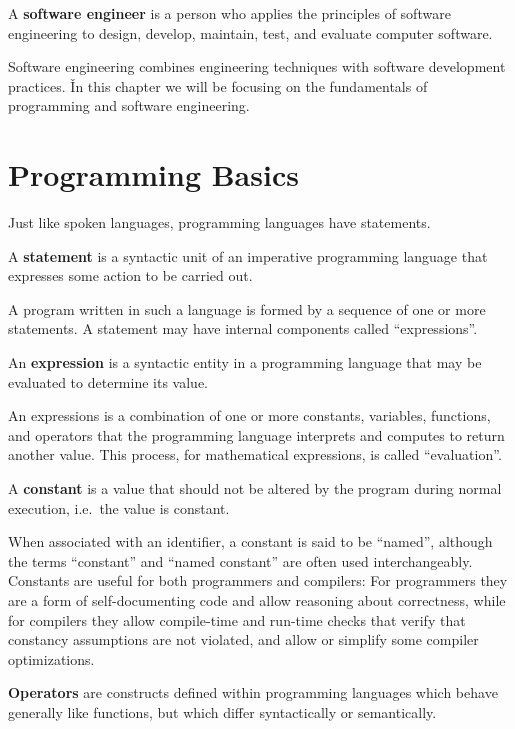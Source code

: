 A \textbf{software engineer} is a person who applies the principles of software engineering to design, develop,
maintain, test, and evaluate computer software.
\ed

Software engineering combines engineering techniques with software development practices. \v

In this chapter we will be focusing on the fundamentals of programming and software engineering.

\section{Programming Basics}

Just like spoken languages, programming languages have statements.

\bd[Statement]
A \textbf{statement} is a syntactic unit of an imperative programming language that expresses some action to be carried
out.
\ed

A program written in such a language is formed by a sequence of one or more statements. A statement may have internal
components called ``expressions''.

\bd[Expression]
An \textbf{expression} is a syntactic entity in a programming language that may be evaluated to determine its value.
\ed

An expressions is a combination of one or more constants, variables, functions, and operators that the programming
language interprets and computes to return another value. This process, for mathematical expressions, is called
``evaluation''.

\bd[Constant]
A \textbf{constant} is a value that should not be altered by the program during normal execution, i.e.\ the value is
constant.
\ed

When associated with an identifier, a constant is said to be ``named'', although the terms ``constant'' and ``named
constant'' are often used interchangeably. Constants are useful for both programmers and compilers: For programmers
they are a form of self-documenting code and allow reasoning about correctness, while for compilers they allow
compile-time and run-time checks that verify that constancy assumptions are not violated, and allow or simplify some
compiler optimizations.

\bd[Operators]
\textbf{Operators} are constructs defined within programming languages which behave generally like functions, but
which differ syntactically or semantically.
\ed

